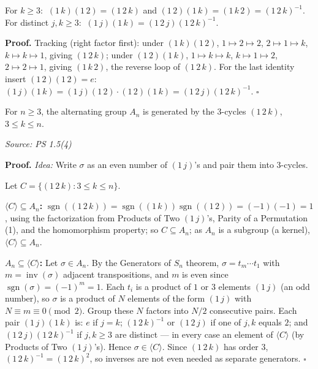 \documentclass[11pt]{report}
\newcommand{\sgn}{\operatorname{sgn}}
\renewenvironment{proof}[1][Proof]{\noindent\textbf{#1.} }{\hfill$\square$\par\vspace{5pt}}
\newcommand{\srcline}[1]{\par\hfill{\footnotesize\textit{Source: #1}}}
\begin{document}
\begin{lembox}\label{lem:products-two-1-j-s}
For $k \geq 3$: $\ (1\,k)(1\,2) = (1\,2\,k)$ and $(1\,2)(1\,k) = (1\,k\,2) = (1\,2\,k)^{-1}$. For distinct $j, k \geq 3$: $\ (1\,j)(1\,k) = (1\,2\,j)(1\,2\,k)^{-1}$.
\end{lembox}

\begin{proof}
Tracking (right factor first): under $(1\,k)(1\,2)$, $1 \mapsto 2 \mapsto 2$, $2 \mapsto 1 \mapsto k$, $k \mapsto k \mapsto 1$, giving $(1\,2\,k)$; under $(1\,2)(1\,k)$, $1 \mapsto k \mapsto k$, $k \mapsto 1 \mapsto 2$, $2 \mapsto 2 \mapsto 1$, giving $(1\,k\,2)$, the reverse loop of $(1\,2\,k)$. For the last identity insert $(1\,2)(1\,2) = e$: $(1\,j)(1\,k) = (1\,j)(1\,2)\cdot(1\,2)(1\,k) = (1\,2\,j)(1\,2\,k)^{-1}$.
\end{proof}

\begin{thmbox}[{Generators of $A_n$}]\label{thm:generators-an}
For $n \geq 3$, the alternating group $A_n$ is generated by the $3$-cycles $(1\,2\,k)$, $3 \leq k \leq n$.
\srcline{PS 1.5(4)}
\end{thmbox}

\begin{proof}
\textit{Idea:} Write $\sigma$ as an even number of $(1\,j)$'s and pair them into $3$-cycles.\par
Let $C = \{(1\,2\,k) : 3 \leq k \leq n\}$.

\textbf{$\langle C \rangle \subseteq A_n$:} $\sgn((1\,2\,k)) = \sgn((1\,k))\sgn((1\,2)) = (-1)(-1) = 1$, using the factorization from Products of Two $(1\,j)$'s, Parity of a Permutation (1), and the homomorphism property; so $C \subseteq A_n$; as $A_n$ is a subgroup (a kernel), $\langle C \rangle \subseteq A_n$.

\textbf{$A_n \subseteq \langle C \rangle$:} Let $\sigma \in A_n$. By the Generators of $S_n$ theorem, $\sigma = t_m \cdots t_1$ with $m = \operatorname{inv}(\sigma)$ adjacent transpositions, and $m$ is even since $\sgn(\sigma) = (-1)^m = 1$. Each $t_i$ is a product of $1$ or $3$ elements $(1\,j)$ (an odd number), so $\sigma$ is a product of $N$ elements of the form $(1\,j)$ with $N \equiv m \equiv 0 \pmod 2$. Group these $N$ factors into $N/2$ consecutive pairs. Each pair $(1\,j)(1\,k)$ is: $e$ if $j = k$; $(1\,2\,k)^{-1}$ or $(1\,2\,j)$ if one of $j, k$ equals $2$; and $(1\,2\,j)(1\,2\,k)^{-1}$ if $j, k \geq 3$ are distinct --- in every case an element of $\langle C \rangle$ (by Products of Two $(1\,j)$'s). Hence $\sigma \in \langle C \rangle$. Since $(1\,2\,k)$ has order $3$, $(1\,2\,k)^{-1} = (1\,2\,k)^2$, so inverses are not even needed as separate generators.
\end{proof}
\end{document}

